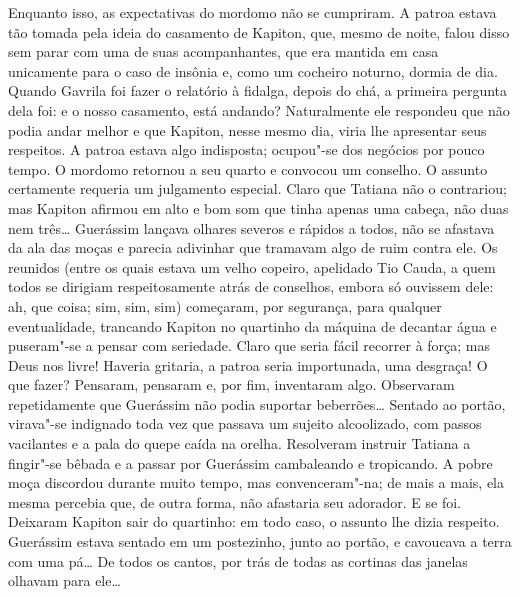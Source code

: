 Enquanto isso, as expectativas do mordomo não se cumpriram. A patroa
estava tão tomada pela ideia do casamento de Kapiton, que, mesmo de
noite, falou disso sem parar com uma de suas acompanhantes, que era
mantida em casa unicamente para o caso de insônia e, como um cocheiro
noturno, dormia de dia. Quando Gavrila foi fazer o relatório à fidalga,
depois do chá, a primeira pergunta dela foi: e o nosso casamento, está
andando? Naturalmente ele respondeu que não podia andar melhor e que
Kapiton, nesse mesmo dia, viria lhe apresentar seus respeitos. A patroa
estava algo indisposta; ocupou"-se dos negócios por pouco tempo. O
mordomo retornou a seu quarto e convocou um conselho. O assunto
certamente requeria um julgamento especial. Claro que Tatiana não o
contrariou; mas Kapiton afirmou em alto e bom som que tinha apenas uma
cabeça, não duas nem três\ldots{} Guerássim lançava olhares severos e rápidos
a todos, não se afastava da ala das moças e parecia adivinhar que
tramavam algo de ruim contra ele. Os reunidos (entre os quais estava um
velho copeiro, apelidado Tio Cauda, a quem todos se dirigiam
respeitosamente atrás de conselhos, embora só ouvissem dele: ah, que
coisa; sim, sim, sim) começaram, por segurança, para qualquer
eventualidade, trancando Kapiton no quartinho da máquina de decantar
água e puseram"-se a pensar com seriedade. Claro que seria fácil recorrer
à força; mas Deus nos livre! Haveria gritaria, a patroa seria
importunada, uma desgraça! O que fazer? Pensaram, pensaram e, por fim,
inventaram algo. Observaram repetidamente que Guerássim não podia
suportar beberrões\ldots{} Sentado ao portão, virava"-se indignado toda vez
que passava um sujeito alcoolizado, com passos vacilantes e a pala do
quepe caída na orelha. Resolveram instruir Tatiana a fingir"-se bêbada e
a passar por Guerássim cambaleando e tropicando. A pobre moça discordou
durante muito tempo, mas convenceram"-na; de mais a mais, ela mesma
percebia que, de outra forma, não afastaria seu adorador. E se foi.
Deixaram Kapiton sair do quartinho: em todo caso, o assunto lhe dizia
respeito. Guerássim estava sentado em um postezinho, junto ao portão, e
cavoucava a terra com uma pá\ldots{} De todos os cantos, por trás de todas as
cortinas das janelas olhavam para ele\ldots{}

